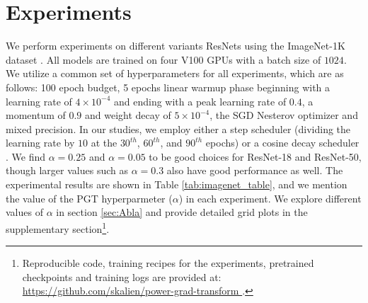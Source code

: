 \documentclass[runningheads]{llncs}
\begin{document}
\section{Experiments}
\label{sec:Expe}




We perform experiments on different variants ResNets using the ImageNet-1K dataset
\cite{deng2009imagenet}. All models are trained on four V100 GPUs with a batch size of
$1024$. We utilize a common set of hyperparameters for all experiments, which are as
follows: 100 epoch budget, 5 epochs linear warmup phase beginning with a learning rate
of $4\times 10^{-4}$ and ending with a peak learning rate of $0.4$, a momentum of $0.9$
and weight decay of $5\times 10^{-4}$, the SGD Nesterov optimizer and mixed precision.
In our studies, we employ either a step scheduler (dividing the learning rate by $10$ at
the $30^{th}$, $60^{th}$, and $90^{th}$ epochs) or a cosine decay scheduler
\cite{loshchilov2016sgdr}. We find $\alpha=0.25$ and $\alpha=0.05$ to be good choices
for ResNet-18 and ResNet-50, though larger values such as $\alpha=0.3$ also have good
performance as well. The experimental results are shown in Table
\ref{tab:imagenet_table}, and we mention the value of the PGT hyperparmeter ($\alpha$)
in each experiment. We explore different values of $\alpha$ in section \ref{sec:Abla}
and provide detailed grid plots in the supplementary section\footnote{Reproducible code,
training recipes for the experiments, pretrained checkpoints and training logs are
provided at: \url{ https://github.com/skalien/power-grad-transform }.}.
\end{document}
